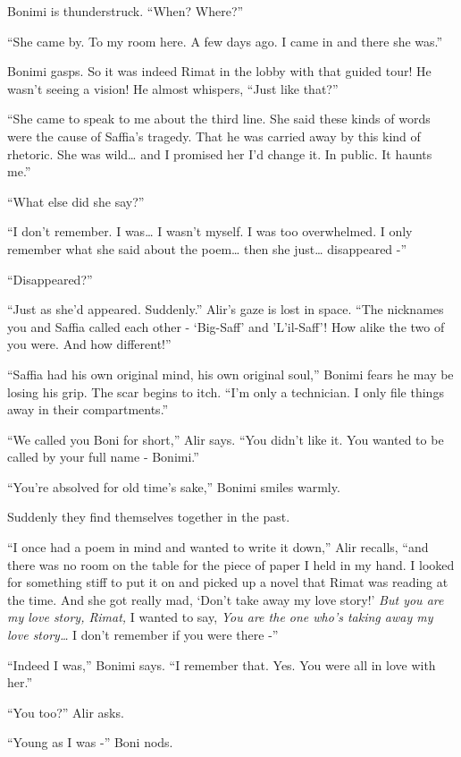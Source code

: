 \documentclass[twoside,11pt]{book}
\begin{document}
Bonimi is thunderstruck. ``When? Where?''

``She came by. To my room here. A few days ago.  I came in and there she was.''

Bonimi gasps. So it was indeed Rimat in the lobby with that guided tour! He wasn't seeing a vision! He almost whispers,
``Just like that?''

``She came to speak to me about the third line. She said these kinds of words were the cause of Saffia's
tragedy. That he was carried away by this kind of rhetoric. She was wild{\dots} and I promised her I'd
change it. In public. It haunts me.''

``What else did she say?''

``I don't remember. I was{\dots} I wasn't myself. I was too overwhelmed. I only remember what she said
about the poem{\dots} then she just{\dots} disappeared -''

``Disappeared?''

``Just as she'd appeared. Suddenly.'' Alir's gaze is lost in space. ``The
nicknames you and Saffia called each other - `Big-Saff' and 'L'il-Saff'! How alike the two of you were. And how
different!''

``Saffia had his own original mind, his own original soul,'' Bonimi fears he may be losing his
grip. The scar begins to itch. ``I'm only a technician. I only file things away in their
compartments.''

``We called you Boni for short,'' Alir says. ``You didn't like it. You wanted to
be called by your full name - Bonimi.''

``You're absolved for old time's sake,'' Bonimi smiles warmly.

Suddenly they find themselves together in the past.

``I once had a poem in mind and wanted to write it down,'' Alir recalls, ``and
there was no room on the table for the piece of paper I held in my hand.  I looked for something stiff to put it on and
picked up a novel that Rimat was reading at the time. And she got really mad, `Don't take away my love story!'
\textit{But you are my love story, Rimat,} I wanted to say, \textit{You are the one who's taking away my love
story{\dots}} I don't remember if you were there -''

``Indeed I was,'' Bonimi says. ``I remember that. Yes. You were all in love with
her.''

``You too?'' Alir asks.

``Young as I was -'' Boni nods.
\end{document}

